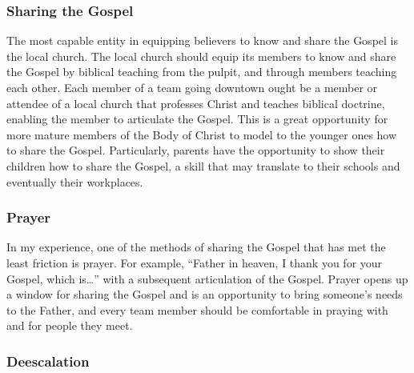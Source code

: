 \documentclass[12pt]{article}
\begin{document}
\subsubsection{Sharing the Gospel}

    \qGreatCommission
    The most capable entity in equipping believers to know and share the Gospel is the local church.
    The local church should equip its members to know and share the Gospel by biblical teaching from the pulpit, and through members teaching each other.
    Each member of a team going downtown ought be a member or attendee of a local church that professes Christ and teaches biblical doctrine, enabling the member to articulate the Gospel.
    This is a great opportunity for more mature members of the Body of Christ to model to the younger ones how to share the Gospel.
    Particularly, parents have the opportunity to show their children how to share the Gospel, a skill that may translate to their schools and eventually their workplaces.

\subsubsection{Prayer}

    In my experience, one of the methods of sharing the Gospel that has met the least friction is prayer.
    For example, ``Father in heaven, I thank you for your Gospel, which is\dots'' with a subsequent articulation of the Gospel.
    Prayer opens up a window for sharing the Gospel and is an opportunity to bring someone's needs to the Father, and every team member should be comfortable in praying with and for people they meet.

\subsubsection{Deescalation}
\end{document}

